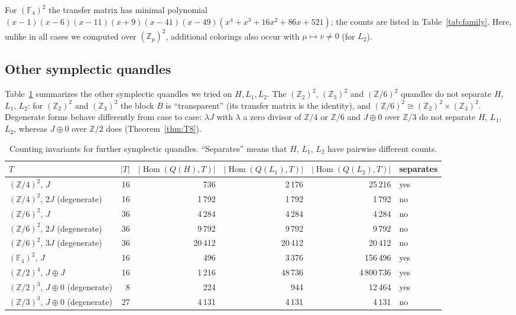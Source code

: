\documentclass[11pt]{article}
\theoremstyle{definition}
\newcommand{\Z}{\mathbb{Z}}
\newcommand{\F}{\mathbb{F}}
\newcommand{\Hom}{\operatorname{Hom}}
\begin{document}
For $(\F_4)^2$ the transfer matrix has minimal polynomial
$(x-1)(x-6)(x-11)(x+9)(x-41)(x-49)(x^4+x^3+16x^2+86x+521)$; the counts are listed in
Table~\ref{tab:family}. Here, unlike in all cases we computed over $(\Z_p)^2$, additional colorings also occur
with $\mu\mapsto v\ne0$ (for $L_2$).

\subsection{Other symplectic quandles}\label{ssec:other}

Table~\ref{tab:other} summarizes the other symplectic quandles we tried on $H,L_1,L_2$. The
$(\Z_2)^2$, $(\Z_3)^2$ and $(\Z/6)^2$ quandles do not separate $H$, $L_1$, $L_2$: for $(\Z_2)^2$ and $(\Z_3)^2$ the block
$B$ is ``transparent'' (its transfer matrix is the identity), and $(\Z/6)^2\cong(\Z_2)^2\times(\Z_3)^2$.
Degenerate forms behave differently from case to case: $\lambda J$ with $\lambda$ a zero divisor of $\Z/4$ or
$\Z/6$ and $J\oplus0$ over $\Z/3$ do not separate $H$, $L_1$, $L_2$, whereas $J\oplus0$ over $\Z/2$ does
(Theorem~\ref{thm:T8}).

\begin{table}[h]
\centering\small
\begin{tabular}{@{}lrrrrl@{}}
\toprule
$T$ & $|T|$ & $|\Hom(Q(H),T)|$ & $|\Hom(Q(L_1),T)|$ & $|\Hom(Q(L_2),T)|$ & separates \\
\midrule
$(\Z/4)^2$, $J$ & 16 & 736 & 2\,176 & 25\,216 & yes \\
$(\Z/4)^2$, $2J$ (degenerate) & 16 & 1\,792 & 1\,792 & 1\,792 & no \\
$(\Z/6)^2$, $J$ & 36 & 4\,284 & 4\,284 & 4\,284 & no \\
$(\Z/6)^2$, $2J$ (degenerate) & 36 & 9\,792 & 9\,792 & 9\,792 & no \\
$(\Z/6)^2$, $3J$ (degenerate) & 36 & 20\,412 & 20\,412 & 20\,412 & no \\
$(\F_4)^2$, $J$ & 16 & 496 & 3\,376 & 156\,496 & yes \\
$(\Z/2)^4$, $J\oplus J$ & 16 & 1\,216 & 48\,736 & 4\,800\,736 & yes \\
$(\Z/2)^3$, $J\oplus0$ (degenerate) & 8 & 224 & 944 & 12\,464 & yes \\
$(\Z/3)^3$, $J\oplus0$ (degenerate) & 27 & 4\,131 & 4\,131 & 4\,131 & no \\
\bottomrule
\end{tabular}
\caption{Counting invariants for further symplectic quandles. ``Separates'' means that $H$, $L_1$, $L_2$ have
pairwise different counts.}
\label{tab:other}
\end{table}
\end{document}

